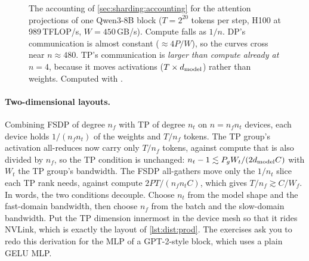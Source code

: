 \begin{figure}[t]
\centering
{}
\caption{The accounting of \cref{sec:sharding:accounting} for the attention projections of one
Qwen3-8B block ($T=2^{20}$ tokens per step, H100 at 989\,TFLOP/s, $W=450$\,GB/s). Compute falls
as $1/n$. DP's communication is almost constant ($\approx4P/W$), so the curves cross near
$n\approx480$. TP's communication is \emph{larger than compute already at $n=4$}, because it moves
activations ($T\times d_{\text{model}}$) rather than weights. Computed with .}
\label{fig:sharding:accounting}
\end{figure}

\paragraph{Two-dimensional layouts.} Combining FSDP of degree $n_f$ with TP of degree $n_t$ on
$n = n_f n_t$ devices, each device holds $1/(n_f n_t)$ of the weights and $T/n_f$ tokens. The TP
group's activation all-reduces now carry only $T/n_f$ tokens, against compute that is also divided
by $n_f$, so the TP condition is unchanged: $n_t - 1\lesssim P_g W_t/(2d_{\text{model}} C)$ with $W_t$ the
TP group's bandwidth. The FSDP all-gathers move only the $1/n_t$ slice each TP rank needs, against
compute $2PT/(n_f n_t C)$, which gives $T/n_f \gtrsim C/W_f$. In words, the two conditions decouple. Choose
$n_t$ from the model shape and the fast-domain bandwidth, then choose $n_f$ from the batch and the
slow-domain bandwidth. Put the TP dimension innermost in the device mesh so that it rides NVLink,
which is exactly the layout of \cref{lst:dist:prod}. The exercises ask you to redo this
derivation for the MLP of a GPT-2-style block, which uses a plain GELU MLP.


